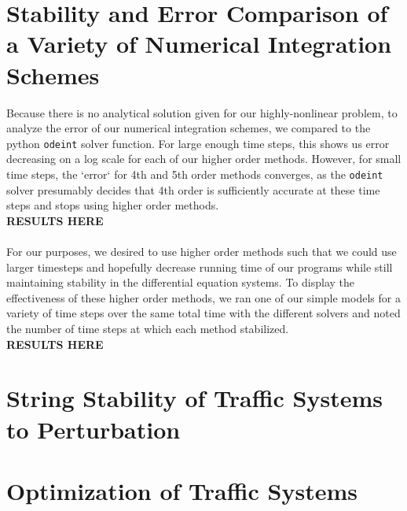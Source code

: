 \documentclass[11pt]{article}
\begin{document}
\section{Stability and Error Comparison of a Variety of Numerical Integration Schemes}
Because there is no analytical solution given for our highly-nonlinear problem, to analyze the error of our numerical integration schemes, we compared to the python \texttt{odeint} solver function. For large enough time steps, this shows us error decreasing on a log scale for each of our higher order methods. However, for small time steps, the `error` for 4th and 5th order methods converges, as the \texttt{odeint} solver presumably decides that 4th order is sufficiently accurate at these time steps and stops using higher order methods.\\
\textbf{RESULTS HERE}
\paragraph{}For our purposes, we desired to use higher order methods such that we could use larger timesteps and hopefully decrease running time of our programs while still maintaining stability in the differential equation systems. To display the effectiveness of these higher order methods, we ran one of our simple models for a variety of time steps over the same total time with the different solvers and noted the number of time steps at which each method stabilized.\\
\textbf{RESULTS HERE}

\section{String Stability of Traffic Systems to Perturbation}


\section{Optimization of Traffic Systems}
\end{document}

